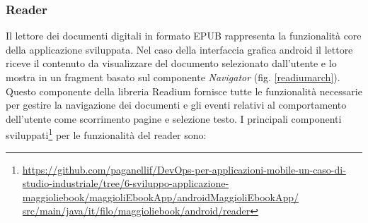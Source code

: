 \subsubsection*{Reader}
Il lettore dei documenti digitali in formato EPUB rappresenta la funzionalità core della applicazione sviluppata. Nel caso della interfaccia grafica android il lettore riceve il contenuto da visualizzare del documento selezionato dall'utente e lo mostra in un fragment basato sul componente \textit{Navigator} (fig. \ref{readiumarch}). Questo componente della libreria Readium fornisce tutte le funzionalità necessarie per gestire la navigazione dei documenti e gli eventi relativi al comportamento dell'utente come scorrimento pagine e selezione testo. I principali componenti sviluppati\footnote{\href{https://github.com/paganellif/DevOps-per-applicazioni-mobile-un-caso-di-studio-industriale/tree/6-sviluppo-applicazione-maggioliebook/maggioliEbookApp/androidMaggioliEbookApp/src/main/java/it/filo/maggioliebook/android/reader}{https://github.com/paganellif/DevOps-per-applicazioni-mobile-un-caso-di-studio-industriale/tree/6-sviluppo-applicazione-maggioliebook/maggioliEbookApp/androidMaggioliEbookApp/\\src/main/java/it/filo/maggioliebook/android/reader}} per le funzionalità del reader sono:


